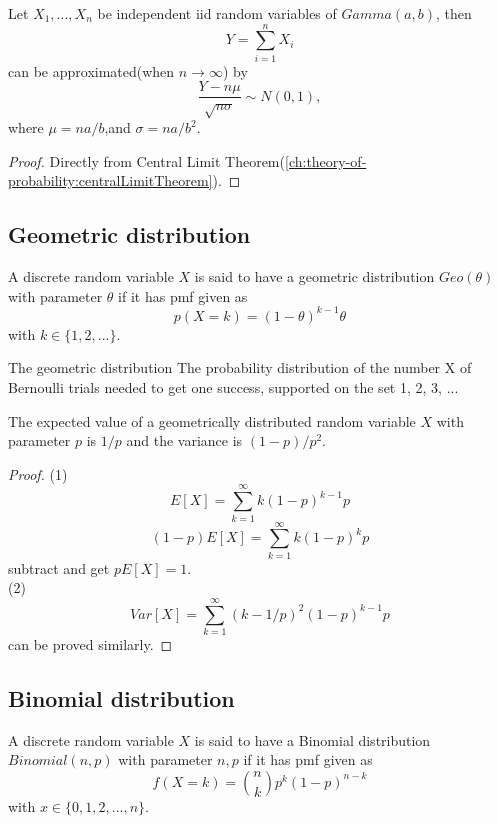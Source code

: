 \begin{refsection}
\begin{lemma}
	Let $X_1,...,X_n$ be independent iid random variables of $Gamma(a,b)$, then
	$$Y = \sum_{i=1}^n X_i$$
	can be approximated(when $n\to \infty$) by $$\frac{Y - n\mu}{\sqrt{n\sigma}}\sim N(0,1),$$
	where $\mu = na/b$,and $\sigma = na/b^2$.
\end{lemma}
\begin{proof}
	Directly from Central Limit Theorem(\autoref{ch:theory-of-probability:centralLimitTheorem}).
\end{proof}

\subsection{Geometric distribution}
\begin{definition}
	A discrete random variable $X$ is said to have a geometric distribution $Geo(\theta)$ with parameter $\theta$ if it has pmf given as
	$$p(X=k) = (1-\theta)^{k-1}\theta$$
	with $k\in \{1,2,...\}$.	
\end{definition}

\begin{remark}
The geometric distribution The probability distribution of the number X of Bernoulli trials needed to get one success, supported on the set { 1, 2, 3, ...}	
\end{remark}


\begin{lemma}\label{ch:theory-of-statistics:th:BasicStatistcsGeometricDistribution}
The expected value of a geometrically distributed random variable $X$ with parameter $p$ is $1/p$ and the variance is $(1-p)/p^2$.
\end{lemma}
\begin{proof}
(1)
	$$E[X] = \sum_{k=1}^\infty k(1-p)^{k-1}p $$
	$$(1-p)E[X] = \sum_{k=1}^\infty k(1-p)^{k}p $$
subtract and get $pE[X] = 1$.\\
(2) 	$$Var[X] = \sum_{k=1}^\infty (k-1/p)^2(1-p)^{k-1}p $$
can be proved similarly.
\end{proof}







\subsection{Binomial distribution}
\begin{definition}
	A discrete random variable $X$ is said to have a Binomial distribution $Binomial(n,p)$ with parameter $n,p$ if it has pmf given as
	$$f(X=k) = \binom{n}{k}p^k(1-p)^{n-k}$$
	with $x\in \{0,1,2,...,n\}$.
\end{definition}


\end{refsection}
